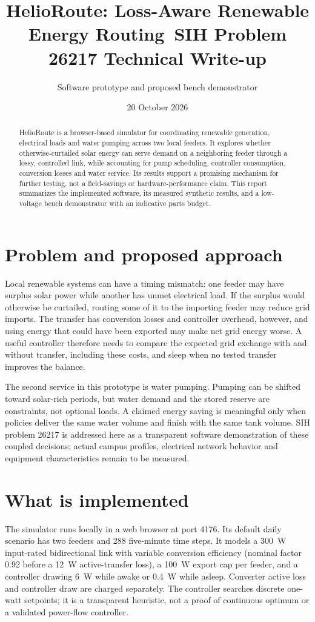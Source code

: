 \documentclass[11pt]{article}
\title{HelioRoute: Loss-Aware Renewable Energy Routing\ \large SIH Problem 26217 Technical Write-up}
\author{Software prototype and proposed bench demonstrator}
\date{20 October 2026}
\begin{document}
\maketitle
\begin{abstract}
HelioRoute is a browser-based simulator for coordinating renewable generation, electrical loads and water pumping across two local feeders. It explores whether otherwise-curtailed solar energy can serve demand on a neighboring feeder through a lossy, controlled link, while accounting for pump scheduling, controller consumption, conversion losses and water service. Its results support a promising mechanism for further testing, not a field-savings or hardware-performance claim. This report summarizes the implemented software, its measured synthetic results, and a low-voltage bench demonstrator with an indicative parts budget.
\end{abstract}

\section{Problem and proposed approach}
Local renewable systems can have a timing mismatch: one feeder may have surplus solar power while another has unmet electrical load. If the surplus would otherwise be curtailed, routing some of it to the importing feeder may reduce grid imports. The transfer has conversion losses and controller overhead, however, and using energy that could have been exported may make net grid energy worse. A useful controller therefore needs to compare the expected grid exchange with and without transfer, including these costs, and sleep when no tested transfer improves the balance.

The second service in this prototype is water pumping. Pumping can be shifted toward solar-rich periods, but water demand and the stored reserve are constraints, not optional loads. A claimed energy saving is meaningful only when policies deliver the same water volume and finish with the same tank volume. SIH problem 26217 is addressed here as a transparent software demonstration of these coupled decisions; actual campus profiles, electrical network behavior and equipment characteristics remain to be measured.

\section{What is implemented}
The simulator runs locally in a web browser at port 4176. Its default daily scenario has two feeders and 288 five-minute time steps. It models a 300~W input-rated bidirectional link with variable conversion efficiency (nominal factor 0.92 before a 12~W active-transfer loss), a 100~W export cap per feeder, and a controller drawing 6~W while awake or 0.4~W while asleep. Converter active loss and controller draw are charged separately. The controller searches discrete one-watt setpoints; it is a transparent heuristic, not a proof of continuous optimum or a validated power-flow controller.
\end{document}

